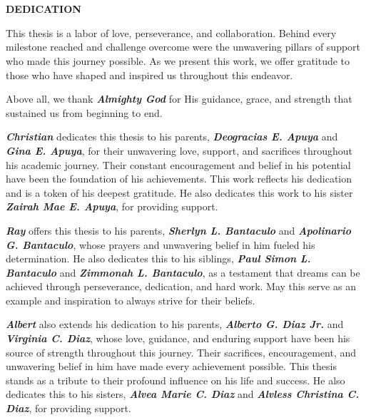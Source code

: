 \chapter*{}

\begin{center}
	{\bf DEDICATION}\\[24pt]
\end{center}


{\baselineskip
	
	This thesis is a labor of love, perseverance, and collaboration. Behind every milestone reached and challenge overcome were the unwavering pillars of support who made this journey possible. As we present this work, we offer gratitude to those who have shaped and inspired us throughout this endeavor.
	
	Above all, we thank \textbf{\textit{Almighty God}} for His guidance, grace, and strength that sustained us from beginning to end.
	
	\textbf{\textit{Christian}} dedicates this thesis to his parents, \textbf{\textit{Deogracias E. Apuya}} and \textbf{\textit{Gina E. Apuya}}, for their unwavering love, support, and sacrifices throughout his academic journey. Their constant encouragement and belief in his potential have been the foundation of his achievements. This work reflects his dedication and is a token of his deepest gratitude. He also dedicates this work to his sister \textbf{\textit{Zairah Mae E. Apuya}}, for providing support.
	
	\textbf{\textit{Ray}} offers this thesis to his parents, \textbf{\textit{Sherlyn L. Bantaculo}} and \textbf{\textit{Apolinario G. Bantaculo}}, whose prayers and unwavering belief in him fueled his determination. He also dedicates this to his siblings, \textbf{\textit{Paul Simon L. Bantaculo}} and \textbf{\textit{Zimmonah L. Bantaculo}}, as a testament that dreams can be achieved through perseverance, dedication, and hard work. May this serve as an example and inspiration to always strive for their beliefs.
	
	\textbf{\textit{Albert}} also extends his dedication to his parents, \textbf{\textit{Alberto G. Diaz Jr.}} and \textbf{\textit{Virginia C. Diaz}}, whose love, guidance, and enduring support have been his source of strength throughout this journey. Their sacrifices, encouragement, and unwavering belief in him have made every achievement possible. This thesis stands as a tribute to their profound influence on his life and success. He also dedicates this to his sisters, \textbf{\textit{Alvea Marie C. Diaz}} and \textbf{\textit{Alvless Christina C. Diaz}}, for providing support.
	
}
